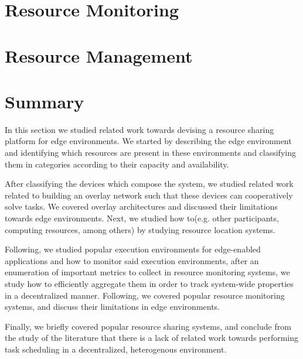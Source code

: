 \section{Resource Monitoring} \label{sec:res_monitoring} 

\section{Resource Management} \label{sec:res_management} 

\section{Summary}

In this section we studied related work towards devising a resource sharing platform for edge environments. We started by describing the edge environment and identifying which resources are present in these environments and classifying them in categories according to their capacity and availability. 

After classifying the devices which compose the system, we studied related work related to building an overlay network such that these devices can cooperatively solve tasks. We covered overlay architectures and discussed their limitations towards edge environments. Next, we studied how to(e.g. other participants, computing resources, among others) by studying resource location systems.

Following, we studied popular execution environments for edge-enabled applications and how to monitor said execution environments, after an enumeration of important metrics to collect in resource monitoring systems, we study how to efficiently aggregate them in order to track system-wide properties in a decentralized manner. Following, we covered popular resource monitoring systems, and discuss their limitations in edge environments. 

Finally, we briefly covered popular resource sharing systems, and conclude from the study of the literature that there is a lack of related work towards performing task scheduling in a decentralized, heterogenous environment. 